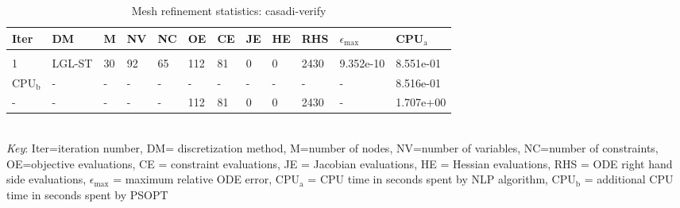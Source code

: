 
\begin{table}
\caption{Mesh refinement statistics: casadi-verify}
\label{mesh_stats_cv}
\renewcommand{\tabcolsep}{0.15cm}
\small
\begin{tabular}{llllllllllll}
Iter&DM&M&NV&NC&OE&CE&JE&HE&RHS&$\epsilon_{\max}$&CPU$_\mathrm{a}$ \\ \hline \\
1&LGL-ST&30&92&65&112&81&0&0&2430&9.352e-10&8.551e-01\\
\hline
CPU$_\mathrm{b}$ &-&-&-&-&-&-&-&-&-&-&8.516e-01\\
-&-&-&-&-&112&81&0&0&2430&-&1.707e+00\\
\end{tabular}
\newline \\ \emph{Key}: Iter=iteration number, DM= discretization method, M=number of nodes, NV=number of variables, NC=number of constraints, OE=objective evaluations,  	              CE = constraint evaluations, JE = Jacobian evaluations, HE = Hessian evaluations, RHS = ODE right hand side 		      evaluations, $\epsilon_{\max}$ = maximum relative ODE error, CPU$_\mathrm{a}$ = CPU time in seconds spent by NLP algorithm, 		      CPU$_\mathrm{b}$ = additional CPU time in seconds spent by PSOPT
\normalsize
\end{table}